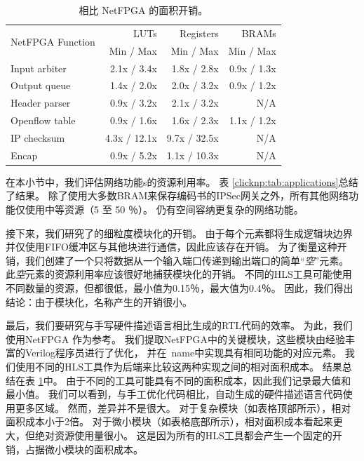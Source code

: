 \begin{table}[htbp]
	\centering
	
	\caption{相比 NetFPGA 的面积开销。}
	\label{clicknp:tab:netfpga}
	\begin{tabular}{l|r|r|r}
		\toprule
		\multirow{2}{2.2cm}{NetFPGA Function} & LUTs & Registers & BRAMs \\
		& Min / Max & Min / Max & Min / Max \\
		\midrule
		Input arbiter  & 2.1x / 3.4x & 1.8x / 2.8x & 0.9x / 1.3x \\
		Output queue   & 1.4x / 2.0x & 2.0x / 3.2x & 0.9x / 1.2x \\
		Header parser  & 0.9x / 3.2x & 2.1x / 3.2x & N/A \\
		Openflow table & 0.9x / 1.6x & 1.6x / 2.3x & 1.1x / 1.2x \\
		\midrule
		\midrule
		IP checksum    & 4.3x / 12.1x & 9.7x / 32.5x & N/A \\
		Encap          & 0.9x / 5.2x & 1.1x / 10.3x & N/A \\
		\bottomrule
	\end{tabular}
	
\end{table}


在本小节中，我们评估\name 网络功能s的资源利用率。
表 \ref {clicknp:tab:applications}总结了结果。
除了使用大多数BRAM来保存编码书的IPSec网关之外，所有其他网络功能仅使用中等资源（5 至 50 ％）。
仍有空间容纳更复杂的网络功能。

接下来，我们研究了\name 的细粒度模块化的开销。
由于每个元素都将生成逻辑块边界并仅使用FIFO缓冲区与其他块进行通信，因此应该存在开销。
为了衡量这种开销，我们创建了一个只将数据从一个输入端口传递到输出端口的简单``\textit{空}''元素。
此\textit {空}元素的资源利用率应该很好地捕获模块化的开销。
不同的HLS工具可能使用不同数量的资源，但都很低，最小值为0.15％，最大值为0.4％。
因此，我们得出结论：由于模块化，名称产生的开销很小。

最后，我们要研究\name 与手写硬件描述语言相比生成的RTL代码的效率。
为此，我们使用NetFPGA \cite {netfpga}作为参考。
我们提取NetFPGA中的关键模块，这些模块由经验丰富的Verilog程序员进行了优化，
并在\ name中实现具有相同功能的对应元素。
我们使用不同的HLS工具作为后端来比较这两种实现之间的相对面积成本。
结果总结在表 \ref {clicknp:tab:netfpga}中。
由于不同的工具可能具有不同的面积成本，因此我们记录最大值和最小值。
我们可以看到，与手工优化代码相比，自动生成的硬件描述语言代码使用更多区域。
然而，差异并不是很大。
对于复杂模块（如表格顶部所示），相对面积成本小于2倍。
对于微小模块（如表格底部所示），相对面积成本看起来更大，但绝对资源使用量很小。
这是因为所有的HLS工具都会产生一个固定的开销，占据微小模块的面积成本。


